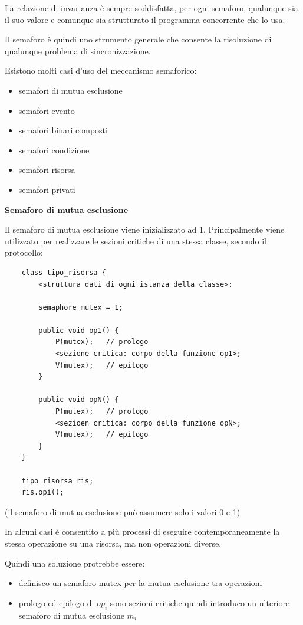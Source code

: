 \documentclass{article}
\begin{document}
La relazione di invarianza è sempre soddisfatta, per ogni semaforo, qualunque sia il suo valore e comunque sia strutturato il programma concorrente che lo usa.

\vspace{5mm}
Il semaforo è quindi uno strumento generale che consente la risoluzione di qualunque problema di sincronizzazione.

Esistono molti casi d'uso del meccanismo semaforico:
\begin{itemize}
    \item semafori di mutua esclusione
    \item semafori evento
    \item semafori binari composti
    \item semafori condizione
    \item semafori risorsa
    \item semafori privati
\end{itemize}

\vspace{5mm}
\textbf{Semaforo di mutua esclusione}

\vspace{3mm}
Il semaforo di mutua esclusione viene inizializzato ad 1. Principalmente viene utilizzato per realizzare le sezioni critiche di una stessa classe, secondo il protocollo:

\begin{lstlisting}
    class tipo_risorsa {
        <struttura dati di ogni istanza della classe>;

        semaphore mutex = 1;

        public void op1() {
            P(mutex);   // prologo
            <sezione critica: corpo della funzione op1>;
            V(mutex);   // epilogo
        }

        public void opN() {
            P(mutex);   // prologo
            <sezioen critica: corpo della funzione opN>;
            V(mutex);   // epilogo
        }
    }

    tipo_risorsa ris;
    ris.opi();
\end{lstlisting}

(il semaforo di mutua esclusione può assumere solo i valori 0 e 1)

\vspace{3mm}
In alcuni casi è consentito a più processi di eseguire contemporaneamente la stessa operazione su una risorsa, ma non operazioni diverse.

Quindi una soluzione protrebbe essere:
\begin{itemize}
    \item definisco un semaforo mutex per la mutua esclusione tra operazioni
    \item prologo ed epilogo di $op_i$ sono sezioni critiche quindi introduco un ulteriore semaforo di mutua esclusione $m_i$
\end{itemize}
\end{document}
